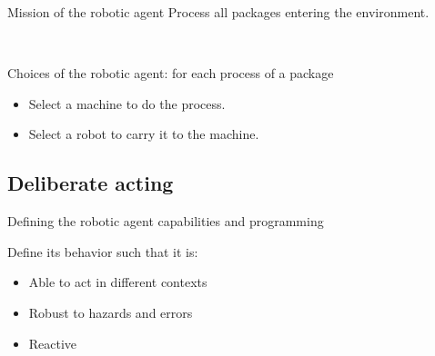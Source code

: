 \begin{frame}{Mission of the robotic agent}
Process all packages entering the environment.

~~

Choices of the robotic agent: for each process of a package
\begin{itemize}
    \pause
    \item Select a machine to do the process.
    \pause
    \item Select a robot to carry it to the machine.
\end{itemize}

\end{frame}


\subsection{Deliberate acting}

\begin{frame}{Defining the robotic agent capabilities and programming}

    Define its behavior such that it is:
    \begin{itemize}
        \pause
        \item Able to act in different contexts
        \pause
        \item Robust to hazards and errors
        \pause
        \item Reactive
    \end{itemize}
   
\end{frame}

